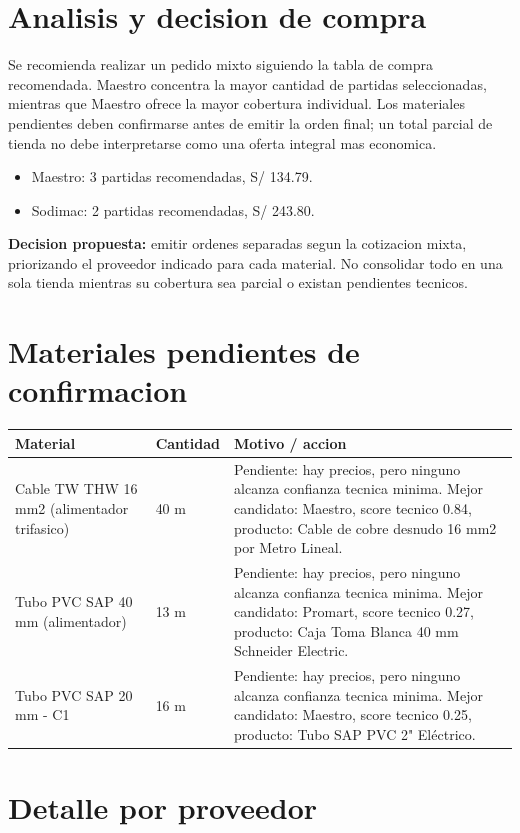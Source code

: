 \documentclass[11pt,a4paper]{article}
\begin{document}
\section{Analisis y decision de compra}
Se recomienda realizar un pedido mixto siguiendo la tabla de compra recomendada. Maestro concentra la mayor cantidad de partidas seleccionadas, mientras que Maestro ofrece la mayor cobertura individual. Los materiales pendientes deben confirmarse antes de emitir la orden final; un total parcial de tienda no debe interpretarse como una oferta integral mas economica.

\begin{itemize}
\item Maestro: 3 partidas recomendadas, S/ 134.79.
\item Sodimac: 2 partidas recomendadas, S/ 243.80.
\end{itemize}

\textbf{Decision propuesta:} emitir ordenes separadas segun la cotizacion mixta, priorizando el proveedor indicado para cada material. No consolidar todo en una sola tienda mientras su cobertura sea parcial o existan pendientes tecnicos.

\section{Materiales pendientes de confirmacion}
\begin{longtable}{p{} p{} p{}}
\toprule Material & Cantidad & Motivo / accion \\ \midrule\endhead
Cable TW THW 16 mm2 (alimentador trifasico) & 40 m & Pendiente: hay precios, pero ninguno alcanza confianza tecnica minima. Mejor candidato: Maestro, score tecnico 0.84, producto: Cable de cobre desnudo 16 mm2 por Metro Lineal. \\
Tubo PVC SAP 40 mm (alimentador) & 13 m & Pendiente: hay precios, pero ninguno alcanza confianza tecnica minima. Mejor candidato: Promart, score tecnico 0.27, producto: Caja Toma Blanca 40 mm Schneider Electric. \\
Tubo PVC SAP 20 mm - C1 & 16 m & Pendiente: hay precios, pero ninguno alcanza confianza tecnica minima. Mejor candidato: Maestro, score tecnico 0.25, producto: Tubo SAP PVC 2" Eléctrico. \\
\bottomrule
\end{longtable}

\section{Detalle por proveedor}
\end{document}
